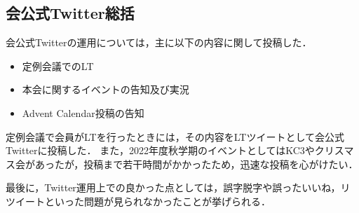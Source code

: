 \subsection*{会公式Twitter総括}

会公式Twitterの運用については，主に以下の内容に関して投稿した．

\begin{itemize}
\item 定例会議でのLT
\item 本会に関するイベントの告知及び実況
\item Advent Calendar投稿の告知
\end{itemize}

定例会議で会員がLTを行ったときには，その内容をLTツイートとして会公式Twitterに投稿した．
また，2022年度秋学期のイベントとしてはKC3やクリスマス会があったが，投稿まで若干時間がかかったため，迅速な投稿を心がけたい．

最後に，Twitter運用上での良かった点としては，誤字脱字や誤ったいいね，リツイートといった問題が見られなかったことが挙げられる．
